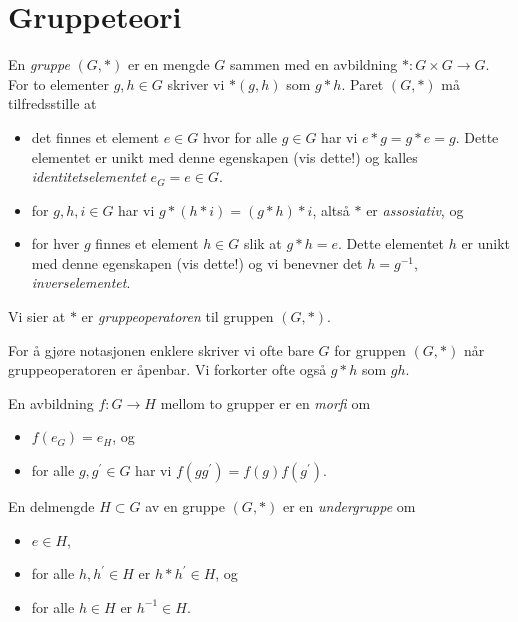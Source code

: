 \section{Gruppeteori}

\begin{definition}
    En \textit{gruppe} $(G,\ast)$ er en mengde $G$ sammen med en avbildning
    $\ast\colon G\times G\to G$.
    For to elementer $g, h\in G$ skriver vi $\ast(g,h)$ som $g\ast h$.
    Paret $(G, \ast)$ må tilfredsstille at
    \begin{itemize}
        \item det finnes et element $e\in G$ hvor for alle $g\in G$
            har vi $e\ast g = g\ast e = g$.
            Dette elementet er unikt med denne egenskapen (vis dette!)
            og kalles \textit{identitetselementet} $e_G = e \in G$.
        \item for $g, h, i\in G$ har vi
            $g\ast (h\ast i) = (g\ast h)\ast i$,
            altså $\ast$ er \textit{assosiativ}, og
        \item for hver $g$ finnes et element $h\in G$
            slik at $g \ast h = e$.
            Dette elementet $h$ er unikt med denne egenskapen (vis dette!)
            og vi benevner det $h = g^{-1}$, \textit{inverselementet}.
    \end{itemize}
    Vi sier at $\ast$ er \textit{gruppeoperatoren} til gruppen $(G,\ast)$.
\end{definition}

For å gjøre notasjonen enklere skriver vi ofte bare $G$ for gruppen $(G,\ast)$
når gruppeoperatoren er åpenbar.
Vi forkorter ofte også $g\ast h$ som $gh$.

\begin{definition}
    En avbildning $f\colon G\to H$ mellom to grupper
    er en \textit{morfi} om
    \begin{itemize}
        \item $f(e_G) = e_H$, og
        \item for alle $g, g^\prime\in G$ har vi $f(gg^\prime) = f(g)f(g^\prime)$.
    \end{itemize}
\end{definition}

\begin{definition}
    En delmengde $H\subset G$ av en gruppe $(G, \ast)$ er en \textit{undergruppe}
    om
    \begin{itemize}
        \item $e\in H$,
        \item for alle $h, h^\prime \in H$ er $h\ast h^\prime\in H$,
            og
        \item for alle $h\in H$ er $h^{-1}\in H$.
    \end{itemize}
\end{definition}

